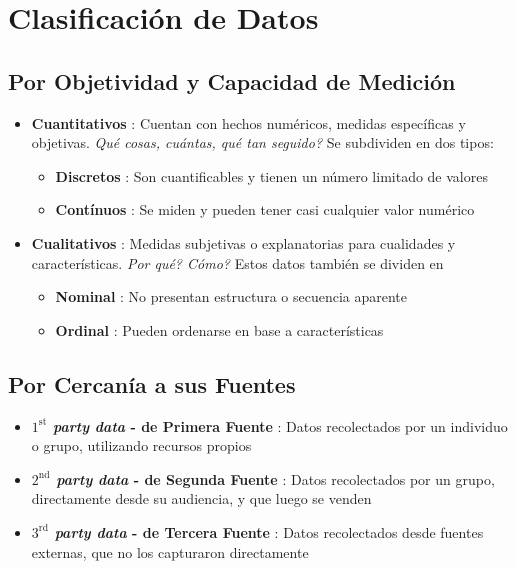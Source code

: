 \section{Clasificación de Datos}
\subsection{Por Objetividad y Capacidad de Medición}
\begin{itemize}
    \item{\textbf{Cuantitativos} : Cuentan con hechos numéricos, medidas específicas y objetivas. \textit{Qué cosas, cuántas, qué tan seguido?} Se subdividen en dos tipos:
    \begin{itemize}
        \item{\textbf{Discretos} : Son cuantificables y tienen un número limitado de valores}
        \item{\textbf{Contínuos} : Se miden y pueden tener casi cualquier valor numérico}
    \end{itemize}}
    \item{\textbf{Cualitativos} : Medidas subjetivas o explanatorias para cualidades y características. \textit{Por qué? Cómo?} Estos datos también se dividen en
    \begin{itemize}
        \item{\textbf{Nominal} : No presentan estructura o secuencia aparente}
        \item{\textbf{Ordinal} : Pueden ordenarse en base a características}
    \end{itemize}}
\end{itemize}

\subsection{Por Cercanía a sus Fuentes}
\begin{itemize}
    \item {\textbf{\textit{$1^{\text{st}}$ party data} - de Primera Fuente} : Datos recolectados por un individuo o grupo, utilizando recursos propios}
    \item {\textbf{\textit{$2^{\text{nd}}$ party data} - de Segunda Fuente} : Datos recolectados por un grupo, directamente desde su audiencia, y que luego se venden}
    \item {\textbf{\textit{$3^{\text{rd}}$ party data} - de Tercera Fuente} : Datos recolectados desde fuentes externas, que no los capturaron directamente}
\end{itemize}


